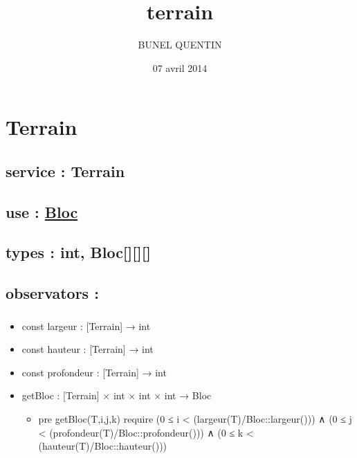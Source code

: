 \documentclass[11pt]{article}
\title{terrain}
\author{BUNEL QUENTIN}
\date{07 avril 2014}
\begin{document}
\maketitle

\setcounter{tocdepth}{3}
\tableofcontents
\vspace*{1cm}
\section{Terrain}
\label{sec-1}

\subsection{service : Terrain}
\label{sec-1.1}

\subsection{use : \href{file:///users/Etu5/3000675/Desktop/spec/bloc.org}{Bloc}}
\label{sec-1.2}

\subsection{types : int, Bloc[][][]}
\label{sec-1.3}



\subsection{observators :}
\label{sec-1.4}

\subsubsection{}

\begin{itemize}

\item const largeur : [Terrain] → int\\
\label{sec-1.4.1.1}


\item const hauteur : [Terrain] → int\\
\label{sec-1.4.1.2}


\item const profondeur : [Terrain] → int\\
\label{sec-1.4.1.3}


\item getBloc : [Terrain] × int × int × int → Bloc\\
\label{sec-1.4.1.4}

\begin{itemize}

\item pre getBloc(T,i,j,k) require (0 ≤ i < (largeur(T)/Bloc::largeur())) ∧ (0 ≤ j < (profondeur(T)/Bloc::profondeur())) ∧ (0 ≤ k < (hauteur(T)/Bloc::hauteur()))\\
\label{sec-1.4.1.4.1}


\end{itemize} %
\end{itemize} %
\end{document}
